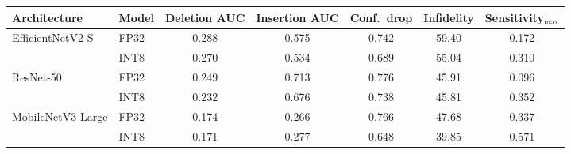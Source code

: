 \begin{tabular}{llccccc}
\toprule
\textbf{Architecture} & \textbf{Model} & \textbf{Deletion AUC} & \textbf{Insertion AUC} & \textbf{Conf.\ drop} & \textbf{Infidelity} & \textbf{Sensitivity$_{\max}$} \\
\midrule
\multirow{2}{*}{EfficientNetV2-S}  & FP32 & 0.288 & 0.575 & 0.742 & 59.40 & 0.172 \\
                                   & INT8 & 0.270 & 0.534 & 0.689 & 55.04 & 0.310 \\
\midrule
\multirow{2}{*}{ResNet-50}         & FP32 & 0.249 & 0.713 & 0.776 & 45.91 & 0.096 \\
                                   & INT8 & 0.232 & 0.676 & 0.738 & 45.81 & 0.352 \\
\midrule
\multirow{2}{*}{MobileNetV3-Large} & FP32 & 0.174 & 0.266 & 0.766 & 47.68 & 0.337 \\
                                   & INT8 & 0.171 & 0.277 & 0.648 & 39.85 & 0.571 \\
\bottomrule
\end{tabular}

